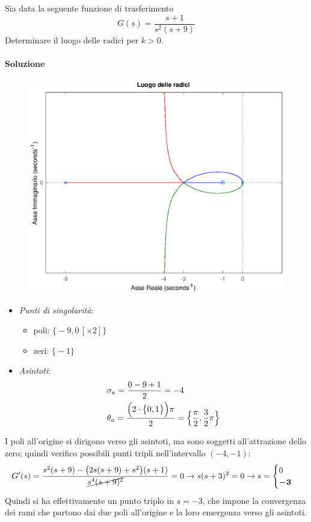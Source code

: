 \begin{esercizio}
Sia data la seguente funzione di trasferimento
\[
	G(s) = \frac{s+1}{s^2 (s+9)}
\]
Determinare il luogo delle radici per \(k>0\).

\paragraph{Soluzione}

\begin{figure}[ht]
	\centering
	\includegraphics[scale=.6]{mod1/assets/rl_ex36}
\end{figure}

\begin{itemize}
	\item \emph{Punti di singolarità}:
		\begin{itemize}
			\item poli: \(\bigl\{ -9, 0\,[\times 2] \bigr\}\)
			\item zeri: \(\bigl\{ -1 \bigr\}\)
		\end{itemize}
	\item \emph{Asintoti}:
		\begin{align*}
			& \sigma_a = \frac{0-9+1}{2} = -4 \\
			& \theta_a = \frac{\Bigl(2 \cdot \bigl\{ 0,1 \bigr\}\Bigr) \pi}{2} = \Bigl\{ \frac{\pi}{2}, \frac{3}{2}\pi \Bigr\}
		\end{align*}
\end{itemize}
I poli all'origine si dirigono verso gli asintoti, ma sono soggetti all'attrazione
dello zero; quindi verifico possibili punti tripli nell'intervallo \((-4,-1)\):
\[
	G^\prime(s) = \frac{s^2(s+9) -\bigl(2s(s+9)+s^2\bigr)(s+1)}{\cancel{s^4 (s+9)^2}} = 0
	\rightarrow s(s+3)^2 = 0 \rightarrow s = \begin{cases} 0 \\ \bm{-3} \end{cases}
\]
Quindi si ha effettivamente un punto triplo in \(s = -3\), che impone la convergenza
dei rami che partono dai due poli all'origine e la loro emergenza verso gli asintoti.
\end{esercizio}

